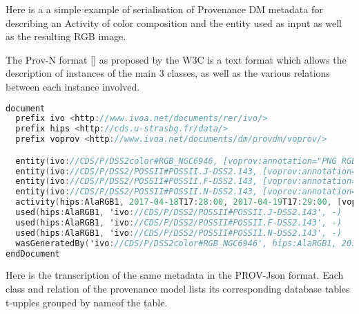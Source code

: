 
Here is a a simple example of serialisation of Provenance DM metadata for describing an Activity of color composition and the entity used as input as well as the resulting RGB image. 

The Prov-N format \ref{} as proposed by the W3C is a text format which allows the description of instances of the main 3 classes, as well as the various relations between each instance involved.

\begin{lstlisting}[language=C, style=customc,caption= PROV-N serialisation example for a Color composition Activity]
document
  prefix ivo <http://www.ivoa.net/documents/rer/ivo/>
  prefix hips <http://cds.u-strasbg.fr/data/>
  prefix voprov <http://www.ivoa.net/documents/dm/provdm/voprov/>

  entity(ivo://CDS/P/DSS2color#RGB_NGC6946, [voprov:annotation="PNG RGB image built from DSS2 with Aladin for galaxy NGC 6946", voprov:doculink="http://cds.u-strasbg.fr/aladin.gml", voprov:name="RGB DSS2 image for NGC 6946"])
  entity(ivo://CDS/P/DSS2/POSSII#POSSII.J-DSS2.143, [voprov:annotation="DSS2 digitization of the Blue POSSII Schmidt survey around  NGC 6946", voprov:doculink="http://cds.u-strasbg.fr/aladin.gm", voprov:name="POSSII Blue Survey DSS2 NGC6946"])
  entity(ivo://CDS/P/DSS2/POSSII#POSSII.F-DSS2.143, [voprov:annotation="DSS2 digitization of the Red POSSII Schmidt survey around NGC 6946", voprov:doculink="http://cds.u-strasbg.fr/aladin.gml", voprov:name="POSSII Red Survey DSS2 NGC6946"])
  entity(ivo://CDS/P/DSS2/POSSII#POSSII.N-DSS2.143, [voprov:annotation="DSS2 digitization of the Infra red POSSII Schmidt survey around NGC 6946", voprov:doculink="http://cds.u-strasbg.fr/aladin.gm", voprov:name="POSSII Infra Red Survey DSS2 NGC6946"])
  activity(hips:AlaRGB1, 2017-04-18T17:28:00, 2017-04-19T17:29:00, [voprov:desc_id="AlaRGB", voprov:desc_type="RGBencoding", voprov:annotation="Aladin RGB image generation for NGC 6946", voprov:desc_name="Aladin RGB image generation algorithm", voprov:name="Aladin RGB 1", voprov:desc_doculink="http://cds.u-strasbg.fr/aladin.gml"])
  used(hips:AlaRGB1, 'ivo://CDS/P/DSS2/POSSII#POSSII.J-DSS2.143', -)
  used(hips:AlaRGB1, 'ivo://CDS/P/DSS2/POSSII#POSSII.F-DSS2.143', -)
  used(hips:AlaRGB1, 'ivo://CDS/P/DSS2/POSSII#POSSII.N-DSS2.143', -)
  wasGeneratedBy('ivo://CDS/P/DSS2color#RGB_NGC6946', hips:AlaRGB1, 2017-05-05T00:00:00)
endDocument
\end{lstlisting}
\newpage

Here is the transcription of the same metadata in the PROV-Json format. 
Each class and relation of the provenance model lists its corresponding database tables t-upples grouped by nameof the table. 

